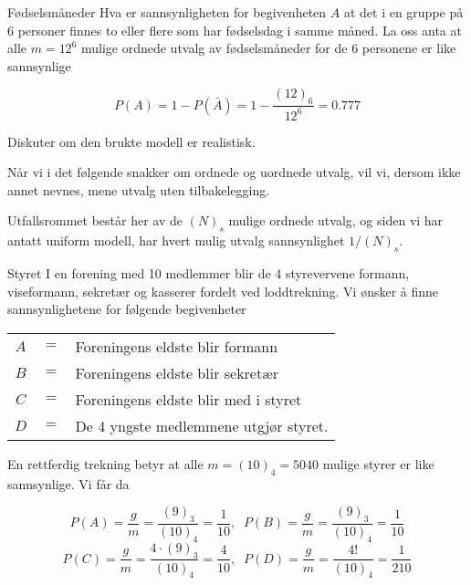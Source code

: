 \begin{eksempel}{Fødselsmåneder}
Hva er sannsynligheten for begivenheten $A$ at det i en gruppe på
6 personer finnes to eller flere som har fødselsdag i samme
måned. La oss anta at alle $m=12^6$ mulige ordnede utvalg av
fødselsmåneder for de 6 personene er like sannsynlige

\[ P(A)=1-P(\bar{A})=1-\frac{(12)_6}{12^6}=0.777 \]

\noindent Diskuter om den brukte modell er realistisk.
\end{eksempel}

Når vi i det følgende snakker om ordnede og uordnede utvalg, vil
vi, dersom ikke annet nevnes, mene utvalg uten tilbakelegging.
\begin{center}  \end{center}

\noindent Utfallsrommet består her av de $(N)_s$ mulige ordnede utvalg, og
siden vi har antatt uniform modell, har hvert mulig utvalg
sannsynlighet $1/(N)_s$.\\

\begin{eksempel}{Styret}
I en forening med 10 medlemmer blir de 4 styrevervene formann,
viseformann, sekretær og kasserer fordelt ved loddtrekning. Vi
ønsker å finne sannsynlighetene for følgende begivenheter
\begin{center}
\begin{tabular}{ccl}
     $A$&$=$& Foreningens eldste blir formann \\
     $B$&$=$& Foreningens eldste blir sekretær \\
     $C$&$=$& Foreningens eldste blir med i styret \\
     $D$&$=$& De 4 yngste medlemmene utgjør styret.
\end{tabular}
\end{center}
En rettferdig trekning betyr at alle $m=(10)_4=5040$ mulige
styrer er like sannsynlige. Vi får da

\[ P(A)=\frac{g}{m}=\frac{(9)_3}{(10)_4}=\frac{1}{10}, \;\;
                        P(B)=\frac{g}{m}=\frac{(9)_3}{(10)_4}=\frac{1}{10} \]
\[ P(C)=\frac{g}{m}=\frac{4 \cdot (9)_3}{(10)_4}=\frac{4}{10}, \;\;
                        P(D)=\frac{g}{m}=\frac{4!}{(10)_4}=\frac{1}{210} \]
\end{eksempel}                 

